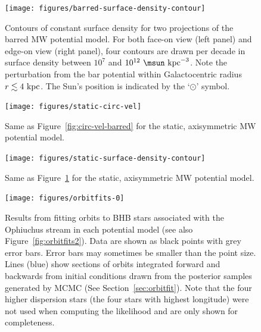 \documentclass[letterpaper,12pt,preprint]{aastex}
\begin{document}
\clearpage
\begin{figure}[p]
\begin{center}
\texttt{[image: figures/barred-surface-density-contour]}
\caption{Contours of constant surface density for two projections of the barred MW potential model. For both face-on view (left panel) and edge-on view (right panel), four contours are drawn per decade in surface density between $10^7$ and $10^{12}~\msun~{\rm kpc}^{-3}$. Note the perturbation from the bar potential within Galactocentric radius $r \lesssim 4~{\rm kpc}$. The Sun's position is indicated by the `$\odot$' symbol.}
\label{fig:surface-density-barred}
\end{center}
\end{figure}

\clearpage
\begin{figure}[p]
\begin{center}
\texttt{[image: figures/static-circ-vel]}
\caption{Same as Figure~\ref{fig:circ-vel-barred} for the static, axisymmetric MW potential model. }
\label{fig:circ-vel-static}
\end{center}
\end{figure}

\clearpage
\begin{figure}[p]
\begin{center}
\texttt{[image: figures/static-surface-density-contour]}
\caption{Same as Figure~\ref{fig:surface-density-barred} for the static, axisymmetric MW potential model. }
\label{fig:surface-density-static}
\end{center}
\end{figure}

\clearpage
\begin{figure}[p]
\begin{center}
\texttt{[image: figures/orbitfits-0]}
\caption{ Results from fitting orbits to BHB stars associated with the Ophiuchus stream in each potential model (see also Figure~\ref{fig:orbitfits2}). Data are shown as black points with grey error bars. Error bars may sometimes be smaller than the point size. Lines (blue) show sections of orbits integrated forward and backwards from initial conditions drawn from the posterior samples generated by MCMC (See Section~\ref{sec:orbitfit}). Note that the four higher dispersion stars (the four stars with highest longitude) were not used when computing the likelihood and are only shown for completeness. }
\label{fig:orbitfits1}
\end{center}
\end{figure}
\end{document}
